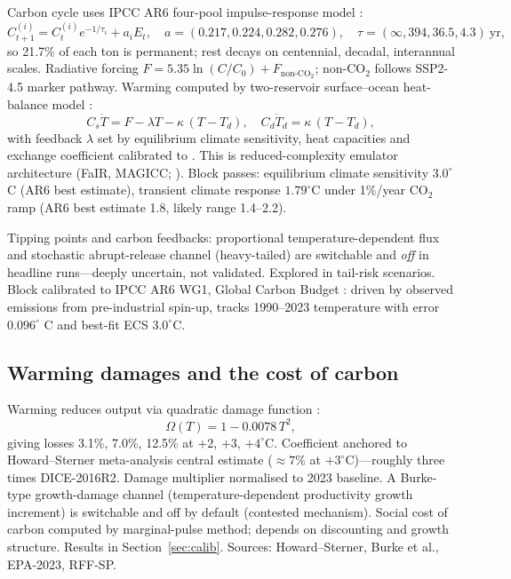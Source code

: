 \documentclass[a4paper,fleqn]{cas-sc}
\begin{document}
Carbon cycle uses IPCC AR6 four-pool impulse-response model \citep{joos2013}:
\begin{equation}
C^{(i)}_{t+1} = C^{(i)}_t e^{-1/\tau_i} + a_i E_t, \quad a = (0.217, 0.224, 0.282, 0.276), \quad \tau = (\infty, 394, 36.5, 4.3)\ \text{yr},
\label{eq:pools}
\end{equation}
so 21.7\% of each ton is permanent; rest decays on centennial, decadal, interannual scales. Radiative forcing $F = 5.35 \ln (C/C_0) + F_{\mathrm{non\text{-}CO_2}}$; non-CO$_2$ follows SSP2-4.5 marker pathway. Warming computed by two-reservoir surface--ocean heat-balance model \citep{geoffroy2013}:
\begin{equation}
C_s \dot T = F - \lambda T - \kappa\,(T - T_d), \quad C_d \dot T_d = \kappa\,(T - T_d),
\label{eq:ebm}
\end{equation}
with feedback $\lambda$ set by equilibrium climate sensitivity, heat capacities and exchange coefficient calibrated to \citet{geoffroy2013}. This is reduced-complexity emulator architecture (FaIR, MAGICC; \citealp{smith2018fair,meinshausen2011}). Block passes: equilibrium climate sensitivity $3.0^{\circ}$C (AR6 best estimate), transient climate response $1.79^{\circ}$C under 1\%/year CO$_2$ ramp (AR6 best estimate 1.8, likely range 1.4--2.2).

Tipping points and carbon feedbacks: proportional temperature-dependent flux and stochastic abrupt-release channel (heavy-tailed) are switchable and \emph{off} in headline runs---deeply uncertain, not validated. Explored in tail-risk scenarios. Block calibrated to IPCC AR6 WG1, Global Carbon Budget \citep{friedlingstein2023}: driven by observed emissions from pre-industrial spin-up, tracks 1990--2023 temperature with error $0.096^{\circ}$ C and best-fit ECS $3.0^{\circ}$C.

\subsection{Warming damages and the cost of carbon}

Warming reduces output via quadratic damage function \citep{nordhaus2017,howard2017}:
\begin{equation}
\Omega(T) = 1 - 0.0078\,T^{2},
\label{eq:damage}
\end{equation}
giving losses 3.1\%, 7.0\%, 12.5\% at +2, +3, $+4^{\circ}$C. Coefficient anchored to Howard--Sterner meta-analysis central estimate (${\approx}7\%$ at $+3^{\circ}$C)---roughly three times DICE-2016R2. Damage multiplier normalised to 2023 baseline. A Burke-type growth-damage channel (temperature-dependent productivity growth increment) is switchable and off by default (contested mechanism). Social cost of carbon computed by marginal-pulse method; depends on discounting and growth structure. Results in Section~\ref{sec:calib}. Sources: Howard--Sterner, Burke et al., EPA-2023, RFF-SP.
\end{document}

